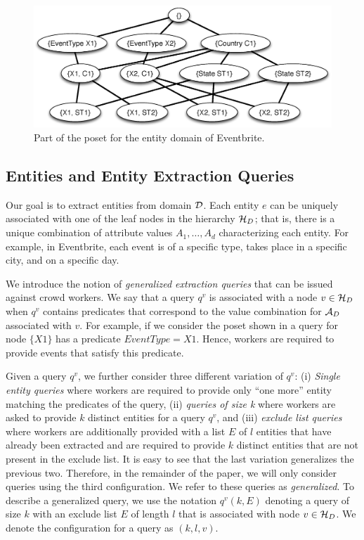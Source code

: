 \begin{figure}[h]
	\begin{center}
	\includegraphics[clip,scale=0.32]{figs/eventsExLattice.eps}
	\caption{Part of the poset for the entity domain of Eventbrite.}
	\label{fig:eventslattice}
	\end{center}
\end{figure}

\subsection{Entities and Entity Extraction Queries}
\label{sec:queries}

 Our goal is to extract entities from domain $\mathcal{D}$. Each entity $e$ can be uniquely associated with one of the leaf nodes in the hierarchy $\mathcal{H}_D$; that is, there is a unique combination of attribute values $A_1, \ldots, A_d$ characterizing each entity. For example, in Eventbrite, each event is of a specific type, takes place in a specific city, and on a specific day.

 We introduce the notion of {\em generalized extraction queries} that can be issued against crowd workers. We say that a query $q^v$ is associated with a node $v \in \mathcal{H}_D$ when $q^v$ contains predicates that correspond to the value combination for $\mathcal{A}_D$ associated with $v$. For example, if we consider the poset shown in  a query for node $\{X1\}$ has a predicate $EventType = X1$. Hence, workers are required to provide events that satisfy this predicate.

Given a query $q^v$, we further consider three different variation of $q^v$: (i) {\em Single entity queries} where workers are required to provide only ``one more'' entity matching the predicates of the query, (ii) {\em queries of size k} where workers are asked to provide $k$ distinct entities for a query $q^v$, and (iii) {\em exclude list queries} where workers are additionally provided with a list $E$ of $l$ entities that have already been extracted and are required to provide $k$ distinct entities that are not present in the exclude list. It is easy to see that the last variation generalizes the previous two. Therefore, in the remainder of the paper, we will only consider queries using the third configuration. We refer to these queries as {\em generalized}. To describe a generalized query, we use the notation $q^v(k,E)$ denoting a query of size $k$ with an exclude list $E$ of length $l$ that is associated with node $v \in \mathcal{H}_D$. We denote the configuration for a query as $(k,l,v)$. 

